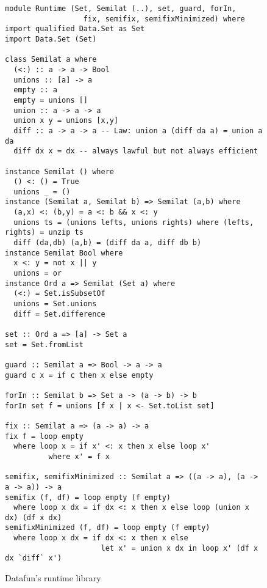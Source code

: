 \begin{figure}
  \footnotesize
  \begin{lstlisting}    
module Runtime (Set, Semilat (..), set, guard, forIn,
                  fix, semifix, semifixMinimized) where
import qualified Data.Set as Set
import Data.Set (Set)

class Semilat a where
  (<:) :: a -> a -> Bool
  unions :: [a] -> a
  empty :: a
  empty = unions []
  union :: a -> a -> a
  union x y = unions [x,y]
  diff :: a -> a -> a -- Law: union a (diff da a) = union a da
  diff dx x = dx -- always lawful but not always efficient

instance Semilat () where
  () <: () = True
  unions _ = ()
instance (Semilat a, Semilat b) => Semilat (a,b) where
  (a,x) <: (b,y) = a <: b && x <: y
  unions ts = (unions lefts, unions rights) where (lefts, rights) = unzip ts
  diff (da,db) (a,b) = (diff da a, diff db b)
instance Semilat Bool where
  x <: y = not x || y
  unions = or
instance Ord a => Semilat (Set a) where
  (<:) = Set.isSubsetOf
  unions = Set.unions
  diff = Set.difference

set :: Ord a => [a] -> Set a
set = Set.fromList

guard :: Semilat a => Bool -> a -> a
guard c x = if c then x else empty

forIn :: Semilat b => Set a -> (a -> b) -> b
forIn set f = unions [f x | x <- Set.toList set]

fix :: Semilat a => (a -> a) -> a
fix f = loop empty
  where loop x = if x' <: x then x else loop x'
          where x' = f x

semifix, semifixMinimized :: Semilat a => ((a -> a), (a -> a -> a)) -> a
semifix (f, df) = loop empty (f empty)
  where loop x dx = if dx <: x then x else loop (union x dx) (df x dx)
semifixMinimized (f, df) = loop empty (f empty)
  where loop x dx = if dx <: x then x else
                      let x' = union x dx in loop x' (df x dx `diff` x')
  \end{lstlisting}
  \caption{Datafun's runtime library}
  \label{figure-runtime-library}
\end{figure}
